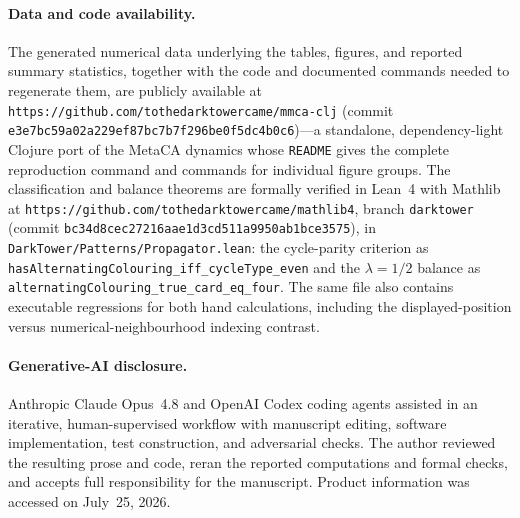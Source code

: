 \documentclass[man,12pt,floatsintext,donotrepeattitle]{apa7}
\begin{document}
\paragraph{Data and code availability.} The generated numerical data underlying
the tables, figures, and reported summary statistics, together with the code and
documented commands needed to regenerate them, are publicly available at
\texttt{https://github.com/tothedarktowercame/mmca-clj} (commit
\texttt{e3e7bc59a02a229ef87bc7b7f296be0f5dc4b0c6})---a standalone,
dependency-light Clojure port of the MetaCA dynamics whose \texttt{README} gives
the complete reproduction command and commands for individual figure groups.
The classification and balance theorems are
formally verified in Lean~4 with Mathlib at
\texttt{https://github.com/tothedarktowercame/mathlib4}, branch \texttt{darktower}
(commit \texttt{bc34d8cec27216aae1d3cd511a9950ab1bce3575}), in
\texttt{DarkTower/Patterns/Propagator.lean}: the cycle-parity criterion as
\texttt{hasAlternatingColouring\_iff\_cycleType\_even} and the $\lambda = 1/2$
balance as \texttt{alternatingColouring\_true\_card\_eq\_four}. The same file
also contains executable regressions for both hand calculations, including the
displayed-position versus numerical-neighbourhood indexing contrast.

\paragraph{Generative-AI disclosure.} Anthropic Claude Opus~4.8 and OpenAI
Codex coding agents \parencite{anthropic_claude,openai_codex} assisted in an
iterative, human-supervised workflow with manuscript editing, software
implementation, test construction, and adversarial checks. The author reviewed
the resulting prose and code, reran the reported computations and formal
checks, and accepts full responsibility for the manuscript. Product information
was accessed on July~25, 2026.

\printbibliography
\end{document}
